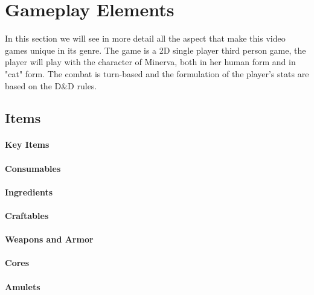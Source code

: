 \section{Gameplay Elements}

In this section we will see in more detail all the aspect that make this video games unique in its genre. The game is a 2D single player third person game, the player will play with the character of Minerva, both in her human form and in "cat" form. The combat is turn-based and the formulation of the player's stats are based on the D\&D rules.



\subsection{Items}

\paragraph{Key Items}


\pagebreak
\paragraph{Consumables}


\paragraph{Ingredients}


\paragraph{Craftables}


\paragraph{Weapons and Armor}


\paragraph{Cores}


\paragraph{Amulets}


